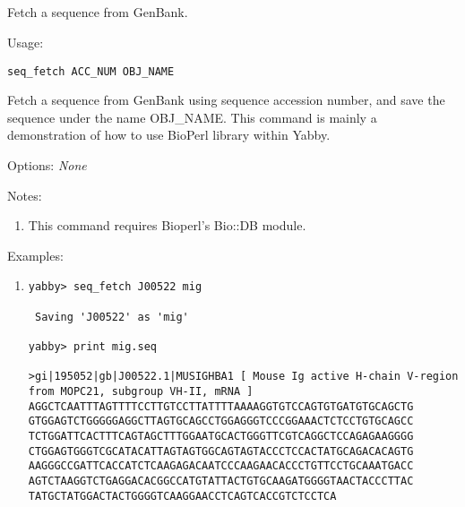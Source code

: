 


\subsection[seq\_fetch]{  }



Fetch a sequence from GenBank.


\begin{description}


\item{Usage:}

{\tt seq\_fetch ACC\_NUM OBJ\_NAME}

Fetch a sequence from GenBank using sequence accession number,
and save the sequence under the name OBJ\_NAME. This command
is mainly a demonstration of how to use BioPerl library within
Yabby.


\item{Options:} {\em None}


\item{Notes:}
\begin{enumerate}
\item This command requires Bioperl's Bio::DB module.
\end{enumerate}


\item{Examples:}
\begin{enumerate}

\item
\begin{verbatim}
yabby> seq_fetch J00522 mig

 Saving 'J00522' as 'mig'

yabby> print mig.seq

>gi|195052|gb|J00522.1|MUSIGHBA1 [ Mouse Ig active H-chain V-region from MOPC21, subgroup VH-II, mRNA ]
AGGCTCAATTTAGTTTTCCTTGTCCTTATTTTAAAAGGTGTCCAGTGTGATGTGCAGCTG
GTGGAGTCTGGGGGAGGCTTAGTGCAGCCTGGAGGGTCCCGGAAACTCTCCTGTGCAGCC
TCTGGATTCACTTTCAGTAGCTTTGGAATGCACTGGGTTCGTCAGGCTCCAGAGAAGGGG
CTGGAGTGGGTCGCATACATTAGTAGTGGCAGTAGTACCCTCCACTATGCAGACACAGTG
AAGGGCCGATTCACCATCTCAAGAGACAATCCCAAGAACACCCTGTTCCTGCAAATGACC
AGTCTAAGGTCTGAGGACACGGCCATGTATTACTGTGCAAGATGGGGTAACTACCCTTAC
TATGCTATGGACTACTGGGGTCAAGGAACCTCAGTCACCGTCTCCTCA
\end{verbatim}


\end{enumerate}
\end{description}
